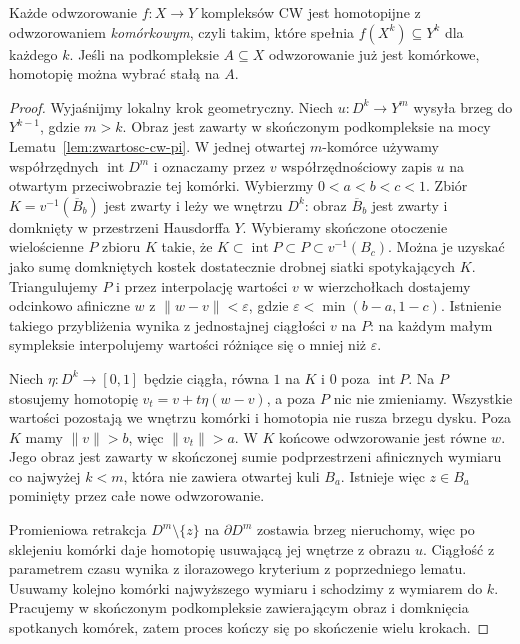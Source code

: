 \begin{twierdzenie}
\label{thm:przyblizenie-komorkowe}
Każde odwzorowanie $f:X\to Y$ kompleksów CW
jest homotopijne z odwzorowaniem
\emph{komórkowym}, czyli takim,
które spełnia
$f(X^k)\subseteq Y^k$ dla
każdego $k$. Jeśli na
podkompleksie $A\subseteq X$
odwzorowanie już jest komórkowe,
homotopię można wybrać
stałą na $A$.
\end{twierdzenie}
\begin{proof}
Wyjaśnijmy lokalny krok geometryczny. Niech
$u:D^k\to Y^m$ wysyła brzeg do $Y^{k-1}$, gdzie $m>k$.
Obraz jest zawarty w skończonym podkompleksie na mocy
Lematu~\ref{lem:zwartosc-cw-pi}. W jednej otwartej $m$-komórce
używamy współrzędnych $\operatorname{int}D^m$ i oznaczamy przez $v$
współrzędnościowy zapis $u$ na otwartym przeciwobrazie tej komórki.
Wybierzmy $0<a<b<c<1$. Zbiór $K=v^{-1}(\overline B_b)$
jest zwarty i leży we wnętrzu $D^k$: obraz $\overline B_b$
jest zwarty i domknięty w przestrzeni Hausdorffa $Y$.
Wybieramy skończone otoczenie wielościenne $P$ zbioru $K$
takie, że $K\subset\operatorname{int}P\subset P\subset v^{-1}(B_c)$.
Można je uzyskać jako sumę domkniętych kostek dostatecznie drobnej siatki
spotykających $K$. Triangulujemy $P$ i przez interpolację wartości $v$
w wierzchołkach dostajemy odcinkowo afiniczne $w$ z
$\|w-v\|<\varepsilon$, gdzie $\varepsilon<\min(b-a,1-c)$.
Istnienie takiego przybliżenia wynika z jednostajnej ciągłości $v$ na $P$:
na każdym małym sympleksie interpolujemy wartości różniące się o mniej niż $\varepsilon$.

Niech $\eta:D^k\to[0,1]$ będzie ciągła, równa $1$ na $K$
i $0$ poza $\operatorname{int}P$. Na $P$ stosujemy homotopię
$v_t=v+t\eta(w-v)$, a poza $P$ nic nie zmieniamy.
Wszystkie wartości pozostają we wnętrzu komórki i homotopia nie rusza brzegu dysku.
Poza $K$ mamy $\|v\|>b$, więc $\|v_t\|>a$.
W $K$ końcowe odwzorowanie jest równe $w$.
Jego obraz jest zawarty w skończonej sumie podprzestrzeni afinicznych
wymiaru co najwyżej $k<m$, która nie zawiera otwartej kuli $B_a$.
Istnieje więc $z\in B_a$ pominięty przez całe nowe odwzorowanie.

Promieniowa retrakcja $D^m\setminus\{z\}$ na $\partial D^m$
zostawia brzeg nieruchomy, więc po sklejeniu komórki daje homotopię
usuwającą jej wnętrze z obrazu $u$. Ciągłość z parametrem czasu
wynika z ilorazowego kryterium z poprzedniego lematu.
Usuwamy kolejno komórki najwyższego wymiaru i schodzimy z wymiarem do $k$.
Pracujemy w skończonym podkompleksie zawierającym obraz i domknięcia
spotkanych komórek, zatem proces kończy się po skończenie wielu krokach.


\end{proof}
